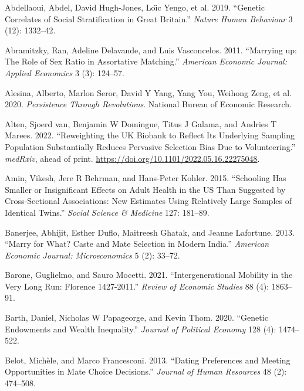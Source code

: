 \documentclass[
  12pt,
]{article}
\newlength{\cslhangindent}
\newenvironment{CSLReferences}[2] %
 {\begin{list}{}{%
  \setlength{\itemindent}{0pt}
  \setlength{\leftmargin}{0pt}
  \setlength{\parsep}{0pt}
  \ifodd #1
   \setlength{\leftmargin}{\cslhangindent}
   \setlength{\itemindent}{-1\cslhangindent}
  \fi
  \setlength{\itemsep}{#2\baselineskip}}}
 {\end{list}}
\theoremstyle{definition}
\theoremstyle{definition}
\theoremstyle{definition}
\theoremstyle{definition}
\theoremstyle{remark}
\begin{document}
\protect{}\label{refs}
\begin{CSLReferences}{1}{1}
{Abdellaoui, Abdel, David Hugh-Jones, Loı̈c Yengo, et al.} 2019. {``Genetic Correlates of Social Stratification in Great Britain.''} \emph{Nature Human Behaviour} 3 (12): 1332--42.

Abramitzky, Ran, Adeline Delavande, and Luis Vasconcelos. 2011. {``Marrying up: The Role of Sex Ratio in Assortative Matching.''} \emph{American Economic Journal: Applied Economics} 3 (3): 124--57.

{Alesina, Alberto, Marlon Seror, David Y Yang, Yang You, Weihong Zeng, et al.} 2020. \emph{Persistence Through Revolutions}. National Bureau of Economic Research.

Alten, Sjoerd van, Benjamin W Domingue, Titus J Galama, and Andries T Marees. 2022. {``Reweighting the UK Biobank to Reflect Its Underlying Sampling Population Substantially Reduces Pervasive Selection Bias Due to Volunteering.''} \emph{medRxiv}, ahead of print. \url{https://doi.org/10.1101/2022.05.16.22275048}.

Amin, Vikesh, Jere R Behrman, and Hans-Peter Kohler. 2015. {``Schooling Has Smaller or Insignificant Effects on Adult Health in the US Than Suggested by Cross-Sectional Associations: New Estimates Using Relatively Large Samples of Identical Twins.''} \emph{Social Science \& Medicine} 127: 181--89.

Banerjee, Abhijit, Esther Duflo, Maitreesh Ghatak, and Jeanne Lafortune. 2013. {``Marry for What? Caste and Mate Selection in Modern India.''} \emph{American Economic Journal: Microeconomics} 5 (2): 33--72.

Barone, Guglielmo, and Sauro Mocetti. 2021. {``Intergenerational Mobility in the Very Long Run: Florence 1427-2011.''} \emph{Review of Economic Studies} 88 (4): 1863--91.

Barth, Daniel, Nicholas W Papageorge, and Kevin Thom. 2020. {``Genetic Endowments and Wealth Inequality.''} \emph{Journal of Political Economy} 128 (4): 1474--522.

Belot, Michèle, and Marco Francesconi. 2013. {``Dating Preferences and Meeting Opportunities in Mate Choice Decisions.''} \emph{Journal of Human Resources} 48 (2): 474--508.


\end{CSLReferences}
\end{document}
